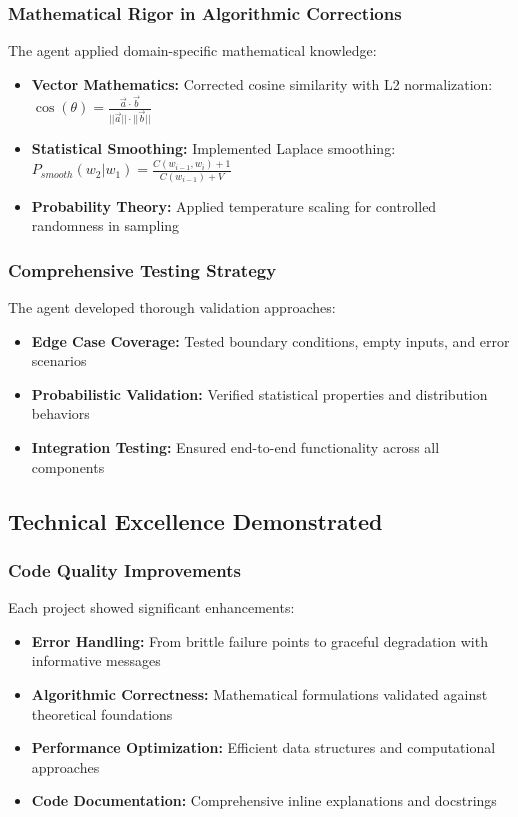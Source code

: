 \documentclass[12pt, a4paper]{article}
\begin{document}
\subsubsection{Mathematical Rigor in Algorithmic Corrections}
The agent applied domain-specific mathematical knowledge:
\begin{itemize}
    \item \textbf{Vector Mathematics:} Corrected cosine similarity with L2 normalization: $\cos(\theta) = \frac{\vec{a} \cdot \vec{b}}{||\vec{a}|| \cdot ||\vec{b}||}$
    \item \textbf{Statistical Smoothing:} Implemented Laplace smoothing: $P_{smooth}(w_2|w_1) = \frac{C(w_{i-1}, w_i) + 1}{C(w_{i-1}) + V}$
    \item \textbf{Probability Theory:} Applied temperature scaling for controlled randomness in sampling
\end{itemize}

\subsubsection{Comprehensive Testing Strategy}
The agent developed thorough validation approaches:
\begin{itemize}
    \item \textbf{Edge Case Coverage:} Tested boundary conditions, empty inputs, and error scenarios
    \item \textbf{Probabilistic Validation:} Verified statistical properties and distribution behaviors
    \item \textbf{Integration Testing:} Ensured end-to-end functionality across all components
\end{itemize}

\subsection{Technical Excellence Demonstrated}

\subsubsection{Code Quality Improvements}
Each project showed significant enhancements:
\begin{itemize}
    \item \textbf{Error Handling:} From brittle failure points to graceful degradation with informative messages
    \item \textbf{Algorithmic Correctness:} Mathematical formulations validated against theoretical foundations
    \item \textbf{Performance Optimization:} Efficient data structures and computational approaches
    \item \textbf{Code Documentation:} Comprehensive inline explanations and docstrings
\end{itemize}
\end{document}
